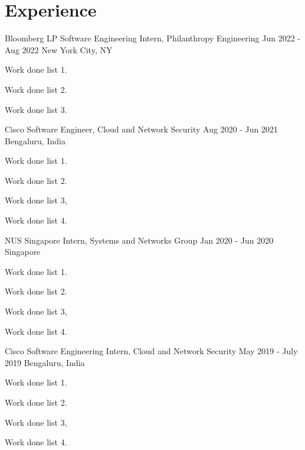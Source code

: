 \section{Experience}
\resumeSubHeadingListStart

\resumeExp
{Bloomberg LP}
{Software Engineering Intern, Philanthropy Engineering}
{Jun 2022 - Aug 2022}
{New York City, NY}

\resumeItemListStart
\item[$\bullet$] Work done list 1.
\item[$\bullet$] Work done list 2.
\item[$\bullet$] Work done list 3.
\resumeItemListEnd


\resumeExp
{Cisco}
{Software Engineer, Cloud and Network Security}
{Aug 2020 - Jun 2021}
{Bengaluru, India}

\resumeItemListStart
\item[$\bullet$] Work done list 1.
\item[$\bullet$] Work done list 2.
\item[$\bullet$] Work done list 3,
\item[$\bullet$] Work done list 4.
\resumeItemListEnd

\resumeExp
{NUS Singapore}
{Intern, Systems and Networks Group}
{Jan 2020 - Jun 2020}
{Singapore}

\resumeItemListStart
\item[$\bullet$] Work done list 1.
\item[$\bullet$] Work done list 2.
\item[$\bullet$] Work done list 3,
\item[$\bullet$] Work done list 4.
\resumeItemListEnd

\resumeExp
{Cisco}
{Software Engineering Intern, Cloud and Network Security}
{May 2019 - July 2019}
{Bengaluru, India}

\resumeItemListStart
\item[$\bullet$] Work done list 1.
\item[$\bullet$] Work done list 2.
\item[$\bullet$] Work done list 3,
\item[$\bullet$] Work done list 4.
\resumeItemListEnd

\resumeSubHeadingListEnd
\vspace{-5.5mm}